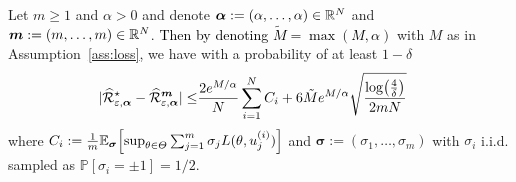 \begin{prop}
\label{prop:control-error-stat}
Let $m\geq 1$ and $\alpha>0$ and denote $\bm{\alpha}:=(\alpha,\dots,\alpha)\in\mathbb{R}^N$ and $\bm{m}:=(m,\dots,m)\in\mathbb{R}^N$.  \textcolor{black}{Then by denoting $\tilde{M}=\max(M,\alpha)$} with $M$ as in Assumption~\ref{ass:loss}, we have with a probability of at least $1-\delta$
\begin{align*}
|\widehat{\mathcal{R}}_{\varepsilon,\bm{\alpha}}^{\star} - \widehat{\mathcal{R}}_{\varepsilon,\bm{\alpha}}^{\bm{m}}|\leq& \frac{2e^{M/\alpha}}{N}\sum_{i=1}^N C_i + \color{black}{6\tilde{M}}\color{black}e^{M/\alpha}\sqrt{\frac{\log(\frac4\delta)}{2mN}}
\end{align*}
where $C_i:=\frac{1}{m}\mathbb{E}_{\bm{\sigma}}\left[\sup_{\theta\in\Theta}\sum_{j=1}^m \sigma_j \loss(\theta,u_j^{(i)})\right]$ and $\bm{\sigma}:=(\sigma_1,\dots,\sigma_m)$ with $\sigma_i$ i.i.d. sampled as $\mathbb{P}[\sigma_i=\pm1]=1/2$.
\end{prop}

